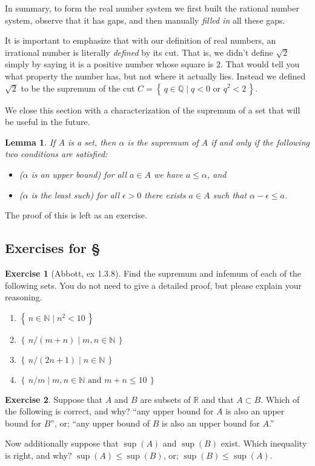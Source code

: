 \documentclass[11pt,oneside]{amsbook}
\newcommand{\set}[1]{\left\{\,#1\,\right\}}
\newcommand{\NN}{\mathbb N}
\newcommand{\QQ}{\mathbb Q}
\newcommand{\RR}{\mathbb R}
\theoremstyle{definition}
\newtheorem{exerc}{Exercise}[section]
\theoremstyle{plain}
\newtheorem{lem}[thm]{Lemma}
\theoremstyle{definition}
\theoremstyle{remark}
\numberwithin{equation}{section}
\numberwithin{figure}{section}
\begin{document}
In summary, to form the real number system we first built the rational number system, observe that it has gaps, and then manually \emph{filled in} all these gaps.

It is important to emphasize that with our definition of real numbers, an irrational number is literally \emph{defined} by its cut. That is, we didn't define $\sqrt2$ simply by saying it is a positive number whose square is $2$. That would tell you what property the number has, but not where it actually lies. Instead we defined $\sqrt2$ to be the supremum of the cut $C=\set{q\in\QQ\mid q<0\text{ or }q^2<2}$.

We close this section with a characterization of the supremum of a set that will be useful in the future.

\begin{lem}
  If $A$ is a set, then $\alpha$ is the supremum of $A$ if and only if the following two conditions are satisfied:
  \begin{itemize}
  \item ($\alpha$ is an upper bound) for all $a\in A$ we have $a\leq\alpha$, and
  \item ($\alpha$ is the least such) for all $\epsilon>0$ there exists $a\in A$ such that $\alpha-\epsilon\leq a$.
  \end{itemize}
\end{lem}

The proof of this is left as an exercise.

\newpage
\subsection*{Exercises for \S \thesection}

\begin{exerc}[Abbott, ex 1.3.8]
  Find the supremum and infemum of each of the following sets. You do not need to give a detailed proof, but please explain your reasoning.
  \begin{enumerate}
  \item $\set{n\in\NN\mid n^2<10}$
  \item $\set{n/(m+n)\mid m,n\in\NN}$
  \item $\set{n/(2n+1)\mid n\in\NN}$
  \item $\set{n/m\mid m,n\in\NN\text{ and }m+n\leq10}$
  \end{enumerate}
\end{exerc}

\begin{exerc}
  Suppose that $A$ and $B$ are subsets of $\RR$ and that $A\subset B$.  Which of the following is correct, and why? ``any upper bound for $A$ is also an upper bound for $B$'', or; ``any upper bound of $B$ is also an upper bound for $A$.''

  Now additionally suppose that $\sup(A)$ and $\sup(B)$ exist.  Which inequality is right, and why? $\sup(A)\leq\sup(B)$, or; $\sup(B)\leq\sup(A)$.
\end{exerc}
\end{document}
